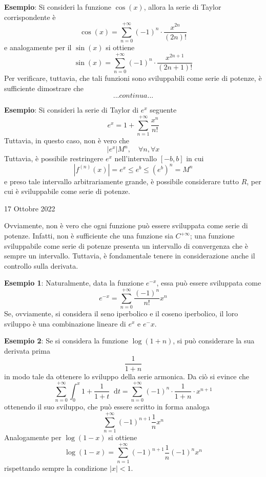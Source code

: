 \documentclass[a4paper]{extarticle}
\newcommand*\dif{\mathop{}\!\mathrm{d}}
\begin{document}
\vspace{1em}
\noindent
\textbf{Esempio}: Si consideri la funzione $\cos(x)$, allora la serie di Taylor corrispondente è
\[\cos(x) = \sum_{n=0}^{+\infty} (-1)^n \cdot \frac{x^{2n}}{(2n)!}\]
e analogamente per il $\sin(x)$ si ottiene
\[\sin(x) = \sum_{n=0}^{+\infty} (-1)^n \cdot \frac{x^{2n+1}}{(2n+1)!}\]
Per verificare, tuttavia, che tali funzioni sono sviluppabili come serie di potenze, è sufficiente dimostrare che
\[... continua ...\]

\vspace{1em}
\noindent
\textbf{Esempio}: Si consideri la serie di Taylor di $e^x$ seguente
\[e^x=1+\sum_{n=1}^{+\infty} \frac{x^n}{n!}\]
Tuttavia, in questo caso, non è vero che
\[\left \vert e^x \right \vert M^n, \hspace{1em} \forall n, \forall x\]
Tuttavia, è possibile restringere $e^x$ nell'intervallo $[-b,b]$ in cui
\[\left \vert f^(n)(x) \right \vert = e^x \leq e^b \leq (e^b)^n = M^n\]
e preso tale intervallo arbitrariamente grande, è possibile considerare tutto $R$, per cui è sviluppabile come serie di potenze.

\newpage
\begin{center}
    17 Ottobre 2022
\end{center}
Ovviamente, non è vero che ogni funzione può essere sviluppata come serie di potenze. Infatti, non è sufficiente che una funzione sia $C^{+\infty}$; una funzione sviluppabile come serie di potenze presenta un intervallo di convergenza che è sempre un intervallo. Tuttavia, è fondamentale tenere in considerazione anche il controllo sulla derivata.

\vspace{1em}
\noindent
\textbf{Esempio 1}: Naturalmente, data la funzione $e^{-x}$, essa può essere sviluppata come
\[e^{-x} = \sum_{n=0}^{+\infty} \frac{(-1)^n}{n!} x^n\]
Se, ovviamente, si considera il seno iperbolico e il coseno iperbolico, il loro sviluppo è una combinazione lineare di $e^x$ e $e^-x$.

\vspace{1em}
\noindent
\textbf{Esempio 2}: Se si considera la funzione $\log(1+n)$, si può considerare la sua derivata prima
\[\frac{1}{1+n}\]
in modo tale da ottenere lo sviluppo della serie armonica. Da ciò si evince che
\[\sum_{n=0}^{+\infty} \int_0^x 1 + \frac{1}{1+t} \dif t = \sum_{n=0}^{+\infty} (-1)^n \cdot \frac{1}{1+n} \cdot x^{n+1}\]
ottenendo il suo sviluppo, che può essere scritto in forma analoga
\[\sum_{n=1}^{+\infty} (-1)^{n+1} \frac{1}{n} x^n\]
Analogamente per $\log(1-x)$ si ottiene
\[\log(1-x) = \sum_{n=1}^{+\infty} (-1)^{n+1} \frac{1}{n} (-1)^n x^n\]
rispettando sempre la condizione $\left \vert x \right \vert < 1$.
\end{document}
